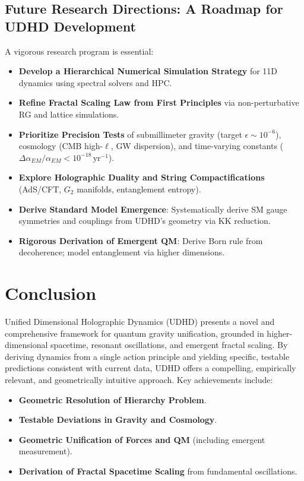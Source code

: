 \documentclass[12pt, a4paper]{article} %
\begin{document}
\subsection{Future Research Directions: A Roadmap for UDHD Development}
A vigorous research program is essential:
\begin{itemize}
    \item \textbf{Develop a Hierarchical Numerical Simulation Strategy} for 11D dynamics using spectral solvers and HPC.
    \item \textbf{Refine Fractal Scaling Law from First Principles} via non-perturbative RG and lattice simulations.
    \item \textbf{Prioritize Precision Tests} of submillimeter gravity (target \( \epsilon \sim 10^{-6} \)), cosmology (CMB high-\(\ell\), GW dispersion), and time-varying constants (\(\Delta\alpha_{EM}/\alpha_{EM} < 10^{-18}\,\text{yr}^{-1}\)).
    \item \textbf{Explore Holographic Duality and String Compactifications} (AdS/CFT, \(G_2\) manifolds, entanglement entropy).
    \item \textbf{Derive Standard Model Emergence}: Systematically derive SM gauge symmetries and couplings from UDHD's geometry via KK reduction.
    \item \textbf{Rigorous Derivation of Emergent QM}: Derive Born rule from decoherence; model entanglement via higher dimensions.
\end{itemize}

\section{Conclusion}
\label{sec:conclusion}
Unified Dimensional Holographic Dynamics (UDHD) presents a novel and comprehensive framework for quantum gravity unification, grounded in higher-dimensional spacetime, resonant oscillations, and emergent fractal scaling. By deriving dynamics from a single action principle and yielding specific, testable predictions consistent with current data, UDHD offers a compelling, empirically relevant, and geometrically intuitive approach. Key achievements include:

\begin{itemize}
    \item \textbf{Geometric Resolution of Hierarchy Problem}.
    \item \textbf{Testable Deviations in Gravity and Cosmology}.
    \item \textbf{Geometric Unification of Forces and QM} (including emergent measurement).
    \item \textbf{Derivation of Fractal Spacetime Scaling} from fundamental oscillations.
\end{itemize}
\end{document}
